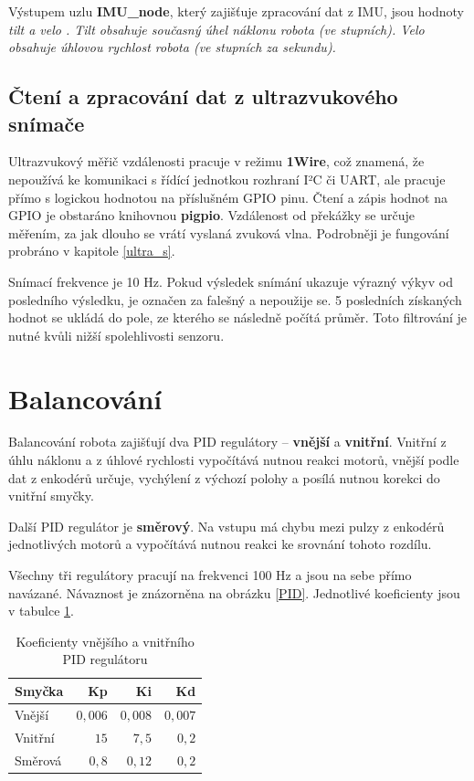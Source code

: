 Výstupem uzlu \textbf{IMU\_node}, který zajišťuje zpracování dat z IMU, jsou hodnoty \it tilt \rm a \it velo \rm. Tilt obsahuje současný úhel náklonu robota (ve stupních). Velo obsahuje úhlovou rychlost robota (ve stupních za sekundu).

\subsection*{Čtení a zpracování dat z ultrazvukového snímače}
Ultrazvukový měřič vzdálenosti pracuje v režimu \textbf{1Wire}, což znamená, že nepoužívá ke komunikaci s řídící jednotkou rozhraní I²C či UART, ale pracuje přímo s logickou hodnotou na příslušném GPIO pinu. Čtení a zápis hodnot na GPIO je obstaráno knihovnou \textbf{pigpio}. Vzdálenost od překážky se určuje měřením, za jak dlouho se vrátí vyslaná zvuková vlna. Podrobněji je fungování probráno v kapitole \ref{ultra_s}.

Snímací frekvence je 10 Hz. Pokud výsledek snímání ukazuje výrazný výkyv od posledního výsledku, je označen za falešný a nepoužije se. 5 posledních získaných hodnot se ukládá do pole, ze kterého se následně počítá průměr. Toto filtrování je nutné kvůli nižší spolehlivosti senzoru.

\section{Balancování}
\label{balanc}

Balancování robota zajišťují dva PID regulátory -- \textbf{vnější} a \textbf{vnitřní}. Vnitřní z úhlu náklonu a z úhlové rychlosti vypočítává nutnou reakci motorů, vnější podle dat z enkodérů určuje, vychýlení z výchozí polohy a posílá nutnou korekci do vnitřní smyčky.

Další PID regulátor je \textbf{směrový}. Na vstupu má chybu mezi pulzy z enkodérů jednotlivých motorů a vypočítává nutnou reakci ke srovnání tohoto rozdílu.

Všechny tři regulátory pracují na frekvenci 100 Hz a jsou na sebe přímo navázané. Návaznost je znázorněna na obrázku \ref{PID}. Jednotlivé koeficienty jsou v tabulce \ref{coeffs}.

\begin{table}[H]
	\vskip6pt
	\caption{Koeficienty vnějšího a vnitřního PID regulátoru} 
    \vskip6pt
	\centering
	\begin{tabular}{lrrr}
		\toprule
		Smyčka & Kp & Ki & Kd \\
		\midrule
        Vnější & $0,006$ & $0,008$ & $0,007$ \\
		Vnitřní & $15$ & $7,5$ & $0,2$ \\
        Směrová & $0,8$ & $0,12$ & $0,2$ \\
		\bottomrule
	\end{tabular}
	\label{coeffs}
\end{table}

